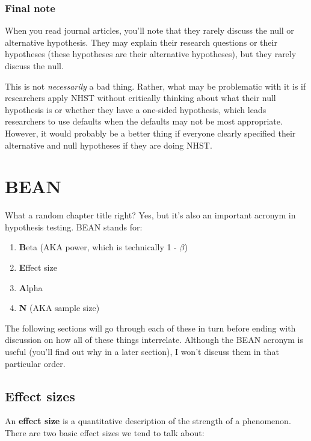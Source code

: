 \documentclass[
]{book}
\providecommand{\tightlist}{%
  \setlength{\itemsep}{0pt}\setlength{\parskip}{0pt}}
\begin{document}
\hypertarget{final-note}{%
\subsection{Final note}\label{final-note}}

When you read journal articles, you'll note that they rarely discuss the null or alternative hypothesis. They may explain their research questions or their hypotheses (these hypotheses are their alternative hypotheses), but they rarely discuss the null.

This is not \emph{necessarily} a bad thing. Rather, what may be problematic with it is if researchers apply NHST without critically thinking about what their null hypothesis is or whether they have a one-sided hypothesis, which leads researchers to use defaults when the defaults may not be most appropriate. However, it would probably be a better thing if everyone clearly specified their alternative and null hypotheses if they are doing NHST.

\hypertarget{bean}{%
\chapter{BEAN}\label{bean}}

What a random chapter title right? Yes, but it's also an important acronym in hypothesis testing. BEAN stands for:

\begin{enumerate}
\def\labelenumi{\arabic{enumi}.}
\tightlist
\item
  \textbf{B}eta (AKA power, which is technically 1 - \(\beta\))
\item
  \textbf{E}ffect size
\item
  \textbf{A}lpha
\item
  \textbf{N} (AKA sample size)
\end{enumerate}

The following sections will go through each of these in turn before ending with discussion on how all of these things interrelate. Although the BEAN acronym is useful (you'll find out why in a later section), I won't discuss them in that particular order.

\hypertarget{effect-sizes}{%
\section{Effect sizes}\label{effect-sizes}}

An \textbf{effect size} is a quantitative description of the strength of a phenomenon. There are two basic effect sizes we tend to talk about:
\end{document}
